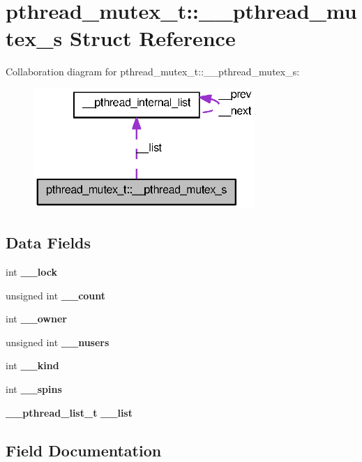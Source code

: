 \section{pthread\_\-mutex\_\-t::\_\-\_\-pthread\_\-mutex\_\-s Struct Reference}
\label{structpthread__mutex__t_1_1____pthread__mutex__s}


Collaboration diagram for pthread\_\-mutex\_\-t::\_\-\_\-pthread\_\-mutex\_\-s:
\nopagebreak
\begin{figure}[H]
\begin{center}
\leavevmode
\includegraphics[width=238pt]{structpthread__mutex__t_1_1____pthread__mutex__s__coll__graph}
\end{center}
\end{figure}
\subsection*{Data Fields}
\begin{DoxyCompactItemize}
\item 
int {\bf \_\-\_\-lock}
\item 
unsigned int {\bf \_\-\_\-count}
\item 
int {\bf \_\-\_\-owner}
\item 
unsigned int {\bf \_\-\_\-nusers}
\item 
int {\bf \_\-\_\-kind}
\item 
int {\bf \_\-\_\-spins}
\item 
{\bf \_\-\_\-pthread\_\-list\_\-t} {\bf \_\-\_\-list}
\end{DoxyCompactItemize}


\subsection{Field Documentation}
